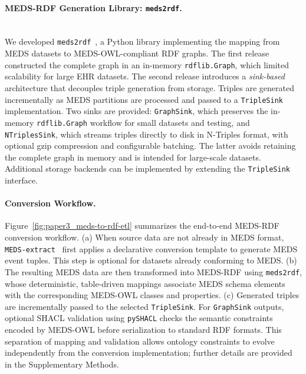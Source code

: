\paragraph{MEDS-RDF Generation Library: \texttt{meds2rdf}.}\label{sec:paper3_meds2rdf}\mbox{}\\
We developed \texttt{meds2rdf}~\cite{marfoglia_teamhekameds2rdf_2025}, a Python library implementing the mapping from MEDS datasets to
MEDS-OWL-compliant RDF graphs. The first release constructed the complete graph in an in-memory \texttt{rdflib.Graph}, which limited scalability for large EHR datasets. The second release introduces a \emph{sink-based} architecture that decouples triple generation from storage. Triples are generated incrementally as MEDS partitions are processed and passed to a \texttt{TripleSink} implementation. Two sinks are provided: \texttt{GraphSink}, which preserves the in-memory \texttt{rdflib.Graph} workflow for small datasets and testing, and \texttt{NTriplesSink}, which streams triples directly to disk in N-Triples format, with optional gzip compression and configurable batching. The latter avoids retaining the complete graph in memory and is intended for large-scale datasets.
Additional storage backends can be implemented by extending the \texttt{TripleSink} interface.

\paragraph{Conversion Workflow.}\label{sec:paper3_end-to-end-worflow}
Figure~\ref{fig:paper3_meds-to-rdf-etl} summarizes the end-to-end MEDS-RDF conversion workflow. (a) When source data are not already in MEDS format, \texttt{MEDS-extract}~\cite{mcdermott_meds_2024} first applies a declarative conversion template to generate MEDS event tuples. This step is optional for datasets already conforming to MEDS. (b) The resulting MEDS data are then transformed into MEDS-RDF using \texttt{meds2rdf}, whose deterministic, table-driven mappings associate MEDS schema elements with the corresponding MEDS-OWL classes and properties. (c) Generated triples are incrementally passed to the selected \texttt{TripleSink}. For \texttt{GraphSink} outputs, optional SHACL validation using \texttt{pySHACL} checks the semantic constraints encoded by MEDS-OWL
before serialization to standard RDF formats. This separation of mapping and validation allows ontology constraints to evolve independently from the conversion implementation; further details are provided in the Supplementary Methods.

